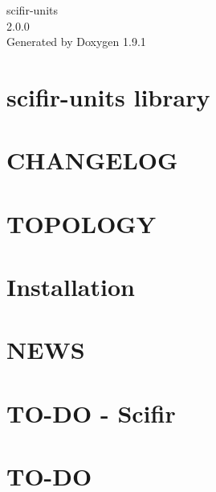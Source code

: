 \let\mypdfximage\pdfximage\def\pdfximage{\immediate\mypdfximage}\documentclass[twoside]{book}
\newcommand{\+}{\discretionary{\mbox{\scriptsize$\hookleftarrow$}}{}{}}
\newcommand{\clearemptydoublepage}{%
  \newpage{\pagestyle{empty}\cleardoublepage}%
}
\begin{document}
\raggedbottom

\hypersetup{pageanchor=false,
             bookmarksnumbered=true,
             pdfencoding=unicode
            }
\begin{titlepage}
\vspace*{7cm}
\begin{center}%
{\Large scifir-\/units \\[1ex]\large 2.\+0.\+0 }\\
\vspace*{1cm}
{\large Generated by Doxygen 1.9.1}\\
\end{center}
\end{titlepage}
\clearemptydoublepage
{}
\tableofcontents
\clearemptydoublepage
{}
\hypersetup{pageanchor=true}

\chapter{scifir-\/units library}
\label{index}\hypertarget{index}{}
\chapter{CHANGELOG}
\label{md_CHANGELOG}

\chapter{TOPOLOGY}
\label{md_HISTORY}

\chapter{Installation}
\label{md_INSTALL}

\chapter{NEWS}
\label{md_NEWS}

\chapter{TO-\/\+DO -\/ Scifir}
\label{md_TO_DO___Scifir}

\chapter{TO-\/\+DO}
\label{md_TO_DO}

\end{document}
